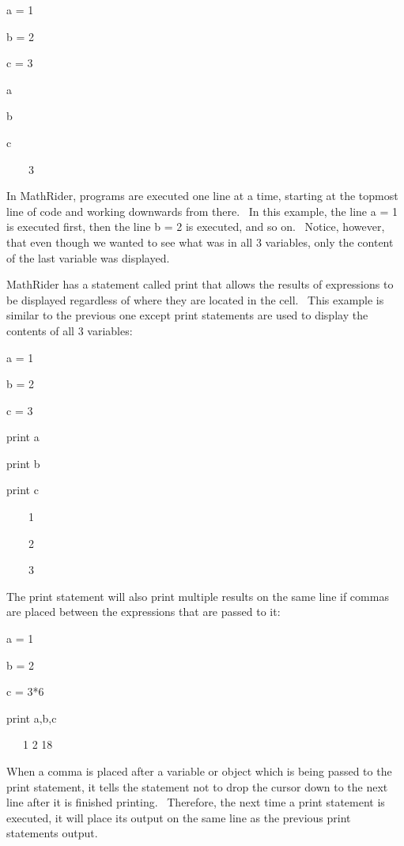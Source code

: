 \documentclass[12pt,twoside]{book}
\begin{document}
\bigskip

a = 1

b = 2

c = 3

a

b

c

{\textbar}

\ \ \ \ 3


\bigskip

In MathRider, programs are executed one line at a time, starting at the topmost line of code and working downwards from there. \ In this example, the line a = 1 is executed first, then the line b = 2 is executed, and so on. \ Notice, however, that even though we wanted to see what was in all 3 variables, only the content of the last variable was displayed. 

\bigskip

MathRider has a statement called print that allows the results of expressions to be displayed regardless of where they are located in the cell. \ This example is similar to the previous one except print statements are used to display the contents of all 3 variables: 

\bigskip

a = 1

b = 2

c = 3

print a

print b

print c

{\textbar}

\ \ \ \ 1

\ \ \ \ 2

\ \ \ \ 3


\bigskip

The print statement will also print multiple results on the same line if commas are placed between the expressions that are passed to it:


\bigskip

a = 1

b = 2

c = 3*6

print a,b,c

{\textbar}

\ \ \ 1 2 18


\bigskip

When a comma is placed after a variable or object which is being passed to the print statement, it tells the statement not to drop the cursor down to the next line after it is finished printing. \ Therefore, the next time a print statement is executed, it will place its output on the same line as the previous print statement{\textquotesingle}s output.
\end{document}

